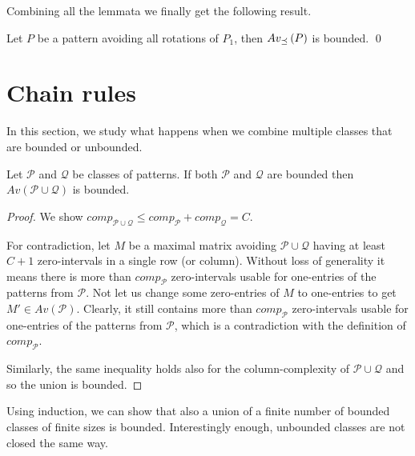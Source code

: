 Combining all the lemmata we finally get the following result.

\begin{thm}
Let $P$ be a pattern avoiding all rotations of $P_1$, then $Av_{\preceq}\left(P\right)$ is bounded. \qed
\end{thm}

\section{Chain rules}
In this section, we study what happens when we combine multiple classes that are bounded or unbounded.

\begin{thm}
\label{thm:boundunion}
Let $\mathcal{P}$ and $\mathcal{Q}$ be classes of patterns. If both $\mathcal{P}$ and $\mathcal{Q}$ are bounded then $Av(\mathcal{P}\cup\mathcal{Q})$ is bounded.
\end{thm}
\begin{proof}
We show $comp_{\mathcal{P}\cup\mathcal{Q}}\leq comp_\mathcal{P}+comp_\mathcal{Q}=C$.

For contradiction, let $M$ be a maximal matrix avoiding $\mathcal{P}\cup\mathcal{Q}$ having at least $C+1$ zero-intervals in a single row (or column). Without loss of generality it means there is more than $comp_\mathcal{P}$ zero-intervals usable for one-entries of the patterns from $\mathcal{P}$. Not let us change some zero-entries of $M$ to one-entries to get $M'\in Av(\mathcal{P})$. Clearly, it still contains more than $comp_\mathcal{P}$ zero-intervals usable for one-entries of the patterns from $\mathcal{P}$, which is a contradiction with the definition of $comp_\mathcal{P}$.

Similarly, the same inequality holds also for the column-complexity of $\mathcal{P}\cup\mathcal{Q}$ and so the union is bounded.
\end{proof}

Using induction, we can show that also a union of a finite number of bounded classes of finite sizes is bounded. Interestingly enough, unbounded classes are not closed the same way.

